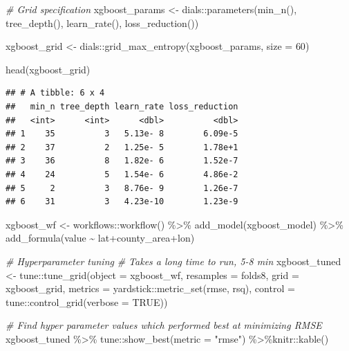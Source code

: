\documentclass[
]{article}
\newenvironment{Shaded}{\begin{snugshade}}{\end{snugshade}}
\newcommand{\AttributeTok}[1]{\textcolor[rgb]{0.77,0.63,0.00}{#1}}
\newcommand{\CommentTok}[1]{\textcolor[rgb]{0.56,0.35,0.01}{\textit{#1}}}
\newcommand{\ConstantTok}[1]{\textcolor[rgb]{0.00,0.00,0.00}{#1}}
\newcommand{\DecValTok}[1]{\textcolor[rgb]{0.00,0.00,0.81}{#1}}
\newcommand{\FunctionTok}[1]{\textcolor[rgb]{0.00,0.00,0.00}{#1}}
\newcommand{\NormalTok}[1]{#1}
\newcommand{\OtherTok}[1]{\textcolor[rgb]{0.56,0.35,0.01}{#1}}
\newcommand{\SpecialCharTok}[1]{\textcolor[rgb]{0.00,0.00,0.00}{#1}}
\newcommand{\StringTok}[1]{\textcolor[rgb]{0.31,0.60,0.02}{#1}}
\begin{document}
\begin{Shaded}
\begin{Highlighting}[]
\CommentTok{\# Grid specification}
\NormalTok{xgboost\_params }\OtherTok{\textless{}{-}}\NormalTok{ dials}\SpecialCharTok{::}\FunctionTok{parameters}\NormalTok{(}\FunctionTok{min\_n}\NormalTok{(), }\FunctionTok{tree\_depth}\NormalTok{(), }\FunctionTok{learn\_rate}\NormalTok{(), }\FunctionTok{loss\_reduction}\NormalTok{())}

\NormalTok{xgboost\_grid }\OtherTok{\textless{}{-}}\NormalTok{ dials}\SpecialCharTok{::}\FunctionTok{grid\_max\_entropy}\NormalTok{(xgboost\_params, }\AttributeTok{size =} \DecValTok{60}\NormalTok{)}

\FunctionTok{head}\NormalTok{(xgboost\_grid)}
\end{Highlighting}
\end{Shaded}

\begin{verbatim}
## # A tibble: 6 x 4
##   min_n tree_depth learn_rate loss_reduction
##   <int>      <int>      <dbl>          <dbl>
## 1    35          3   5.13e- 8        6.09e-5
## 2    37          2   1.25e- 5        1.78e+1
## 3    36          8   1.82e- 6        1.52e-7
## 4    24          5   1.54e- 6        4.86e-2
## 5     2          3   8.76e- 9        1.26e-7
## 6    31          3   4.23e-10        1.23e-9
\end{verbatim}

\begin{Shaded}
\begin{Highlighting}[]
\NormalTok{xgboost\_wf }\OtherTok{\textless{}{-}}\NormalTok{ workflows}\SpecialCharTok{::}\FunctionTok{workflow}\NormalTok{() }\SpecialCharTok{\%\textgreater{}\%}
  \FunctionTok{add\_model}\NormalTok{(xgboost\_model) }\SpecialCharTok{\%\textgreater{}\%} 
  \FunctionTok{add\_formula}\NormalTok{(value }\SpecialCharTok{\textasciitilde{}}\NormalTok{ lat}\SpecialCharTok{+}\NormalTok{county\_area}\SpecialCharTok{+}\NormalTok{lon)}

\CommentTok{\# Hyperparameter tuning}
\CommentTok{\# Takes a long time to run, 5{-}8 min}
\NormalTok{xgboost\_tuned }\OtherTok{\textless{}{-}}\NormalTok{ tune}\SpecialCharTok{::}\FunctionTok{tune\_grid}\NormalTok{(}\AttributeTok{object =}\NormalTok{ xgboost\_wf, }\AttributeTok{resamples =}\NormalTok{ folds8,}
  \AttributeTok{grid =}\NormalTok{ xgboost\_grid, }\AttributeTok{metrics =}\NormalTok{ yardstick}\SpecialCharTok{::}\FunctionTok{metric\_set}\NormalTok{(rmse, rsq),}
  \AttributeTok{control =}\NormalTok{ tune}\SpecialCharTok{::}\FunctionTok{control\_grid}\NormalTok{(}\AttributeTok{verbose =} \ConstantTok{TRUE}\NormalTok{))}

\CommentTok{\# Find hyper parameter values which performed best at minimizing RMSE}
\NormalTok{xgboost\_tuned }\SpecialCharTok{\%\textgreater{}\%}\NormalTok{ tune}\SpecialCharTok{::}\FunctionTok{show\_best}\NormalTok{(}\AttributeTok{metric =} \StringTok{"rmse"}\NormalTok{) }\SpecialCharTok{\%\textgreater{}\%}\NormalTok{knitr}\SpecialCharTok{::}\FunctionTok{kable}\NormalTok{()}
\end{Highlighting}
\end{Shaded}
\end{document}
